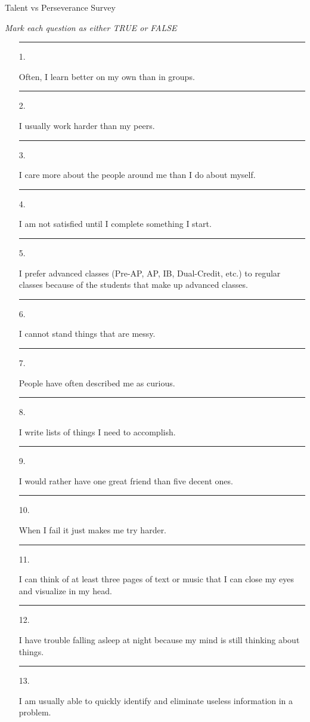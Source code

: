 \documentclass[letterpaper, 12pt]{article}
\begin{document}
	

	
\begin{center} Talent vs Perseverance Survey
\end{center}


		
 \textit{Mark each question as either TRUE or FALSE}
\begin{enumerate}
	\item [\rule{0.4in}{0.01in} 1.]Often, I learn better on my own than in groups.  
    \item [\rule{0.4in}{0.01in} 2.]I usually work harder than my peers.
    \item [\rule{0.4in}{0.01in} 3.]I care more about the people around me than I do about myself.
    \item [\rule{0.4in}{0.01in} 4.]I am not satisfied until I complete something I start.
    \item [\rule{0.4in}{0.01in} 5.]I prefer advanced classes (Pre-AP, AP, IB, Dual-Credit, etc.) to regular classes because of the students that make up advanced classes.
    \item [\rule{0.4in}{0.01in} 6.]I cannot stand things that are messy.
    \item [\rule{0.4in}{0.01in} 7.]People have often described me as curious.
    \item [\rule{0.4in}{0.01in} 8.]I write lists of things I need to accomplish.
    \item [\rule{0.4in}{0.01in} 9.]I would rather have one great friend than five decent ones.
    \item [\rule{0.3in}{0.01in} 10.]When I fail it just makes me try harder.
    \item [\rule{0.3in}{0.01in} 11.]I can think of at least three pages of text or music that I can close my eyes and visualize in my head.
    \item [\rule{0.3in}{0.01in} 12.]I have trouble falling asleep at night because my mind is still thinking about things.
    \item [\rule{0.3in}{0.01in} 13.]I am usually able to quickly identify and eliminate useless information in a problem.

\end{enumerate}
\end{document}
